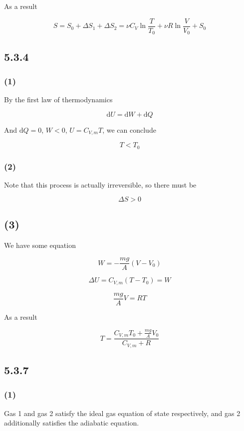 \documentclass[a4paper,11pt]{amsart}
\theoremstyle{definition}
\begin{document}
	As a result
	
	$$
	S=S_0+\Delta S_1+\Delta S_2=\nu C_V\ln \frac{T}{T_0}+\nu R\ln \frac{V}{V_0}+S_0
	$$
	
	\subsection*{5.3.4}
	
	\subsubsection*{(1)}
	
	By the first law of thermodynamics
	
	$$
	\mathrm{d}U=\mathrm{d}W+\mathrm{d}Q
	$$
	
	And $\mathrm{d}Q=0$, $W<0$, $U=C_{V,m}T$, we can conclude
	
	$$
	T<T_0
	$$
	
	\subsubsection*{(2)}
	
	Note that this process is actually irreversible, so there must be
	
	$$
	\Delta S>0
	$$
	
	\subsection*{(3)}
	
	We have some equation
	
	$$
	W=-\frac{mg}{A}\left( V-V_0 \right) 
	$$
	
	$$
	\Delta U=C_{V,m}\left( T-T_0 \right) =W
	$$
	
	$$
	\frac{mg}{A}V=RT
	$$
	
	As a result 
	
	$$
	T=\frac{C_{V,m}T_0+\frac{mg}{A}V_0}{C_{V,m}+R}
	$$
	
	
	\subsection*{5.3.7}
	
	\subsubsection*{(1)}
	
	Gas 1 and gas 2 satisfy the ideal gas equation of state respectively, and gas 2 additionally satisfies the adiabatic equation.
	
\end{document}
